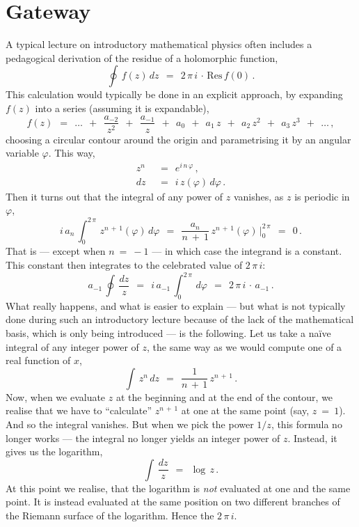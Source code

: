 \documentclass[epsfig,12pt]{article}
\begin{document}
\section{Gateway}
\setcounter{equation}{0}

	A typical lecture on introductory mathematical physics often includes 
	a pedagogical derivation of the residue of a holomorphic function,
\[
	\oint\, f(z)\,dz	~~=~~	2\,\pi\,i\,\cdot\,\text{Res}\,f(0)\,.
\]
	This calculation would typically be done in an explicit approach, by
	expanding $ f(z) $ into a series (assuming it is expandable),
\[
	f(z)	~~=~~	\ldots  ~~+~~  \frac{a_{-2}}{z^2}  ~~+~~  \frac{a_{-1}}{z}  ~~+~~  a_0  ~~+~~ a_1\,z  ~~+~~  a_2\,z^2  ~~+~~  a_3\,z^3  ~~+~~  \ldots\,,
\]
	choosing a circular contour around the origin and parametrising it by an 
	angular variable $ \varphi $.
	This way,
\begin{align*}
%
	z^n	& ~~=~~	e^{i\, n\, \varphi}\,,	\\[2mm]
%
	dz	& ~~=~~	i\,z(\varphi)\,d\varphi\,.
\end{align*}
	Then it turns out that the integral of any power of $ z $ vanishes, as $ z $
	is periodic in $ \varphi $,
\[
	i\, a_n\, \int_0^{2\,\pi}\, z^{n \,+\, 1}(\varphi)\, d\varphi	~~=~~	\frac{a_n}{n ~+~ 1}\, z^{n \,+\, 1}(\varphi)\,\bigg|_0^{2\,\pi}	~~=~~	0\,.
\]
	That is --- except when $ n ~=~ -1 $ --- in which case the integrand is a constant.
	This constant then integrates to the celebrated value of $ 2\, \pi\, i $:
\[
	a_{-1}\, \oint\, \frac{dz}{z}	~~=~~	i\, a_{-1}\, \int_0^{2\,\pi}\, d\varphi	~~=~~	2\,\pi\,i \,\cdot\, a_{-1}\,.
\]
	What really happens, and what is easier to explain --- but what is not typically done during such an introductory lecture
	because of the lack of the mathematical basis, which is only being introduced --- is the following.
	Let us take a na\"{i}ve integral of any integer power of $ z $, the same way as we would compute one of a real function of $ x $,
\[
	\int\, z^n\,dz	~~=~~	\frac{1}{n \,+\, 1}\, z^{n \,+\, 1}\,.
\]
	Now, when we evaluate $ z $ at the beginning and at the end of the contour, we realise that we have to ``calculate''
	$ z^{n \,+\, 1} $ at one at the same point (say, $ z ~=~ 1 $).
	And so the integral vanishes.
	But when we pick the power $ 1/z $, this formula no longer works --- the integral no longer yields an integer power of $ z $.
	Instead, it gives us the logarithm,
\[
	\int\, \frac{dz}{z}	~~=~~	\log\,z\,.
\]
	At this point we realise, that the logarithm is \emph{not} evaluated at one and the same point.
	It is instead evaluated at the same position on two different branches of the Riemann surface of the logarithm.
	Hence the $ 2\,\pi\, i $.
\end{document}
